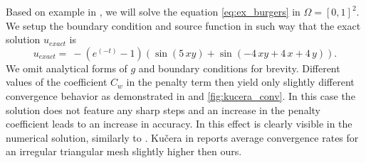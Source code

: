 \begin{example}
\label{ex:kucera}
Based on example in \cite[Section 1.6]{Kucera},
we will solve the equation \eqref{eq:ex_burgers} in $\Omega = [0, 1]^2$.
We setup the boundary condition and source function in such way that the exact
solution $u_{exact}$ is
\begin{equation}
	u_{exact} =  \ -{\left(e^{\left(-t\right)} - 1\right)} {\left(\sin\left(5 \,x
	y\right) + \sin\left(-4 \,
	x y + 4 \,x + 4 \, y\right)\right)}.
\end{equation}
We omit analytical forms of $g$ and boundary conditions for brevity.
Different values of the coefficient $C_w$ in the penalty term then yield only slightly different
convergence behavior as demonstrated in  and 
\ref{fig:kucera_conv}. In this case the solution does not feature any sharp steps and
an increase in the penalty coefficient leads to an increase in accuracy. In 
this effect is clearly visible in the numerical solution, similarly to . Kučera
in \cite{Kucera} reports average convergence rates for an irregular triangular mesh
slightly higher then ours.


\end{example}

